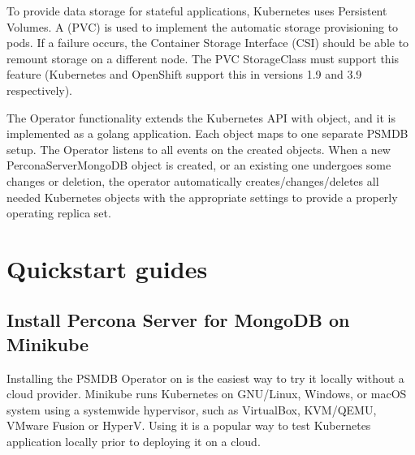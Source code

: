 \documentclass[letterpaper,10pt,english]{sphinxmanual}
\begin{document}
To provide data storage for stateful applications, Kubernetes uses
Persistent Volumes. A  (PVC) is used to implement
the automatic storage provisioning to pods. If a failure occurs, the
Container Storage Interface (CSI) should be able to re\sphinxhyphen{}mount storage on
a different node. The PVC StorageClass must support this feature
(Kubernetes and OpenShift support this in versions 1.9 and 3.9
respectively).

The Operator functionality extends the Kubernetes API with
 object, and it is implemented as a golang
application. Each  object maps to one separate
PSMDB setup. The Operator listens to all events on the created objects.
When a new PerconaServerMongoDB object is created, or an existing one
undergoes some changes or deletion, the operator automatically
creates/changes/deletes all needed Kubernetes objects with the
appropriate settings to provide a properly operating replica set.


\part{Quickstart guides}
\label{\detokenize{index:quickstart-guides}}

\chapter{Install Percona Server for MongoDB on Minikube}
\label{\detokenize{minikube:install-percona-server-for-mongodb-on-minikube}}\label{\detokenize{minikube:install-minikube}}\label{\detokenize{minikube::doc}}
Installing the PSMDB Operator on 
is the easiest way to try it locally without a cloud provider. Minikube runs
Kubernetes on GNU/Linux, Windows, or macOS system using a system\sphinxhyphen{}wide
hypervisor, such as VirtualBox, KVM/QEMU, VMware Fusion or Hyper\sphinxhyphen{}V. Using it is
a popular way to test Kubernetes application locally prior to deploying it on a
cloud.
\end{document}

